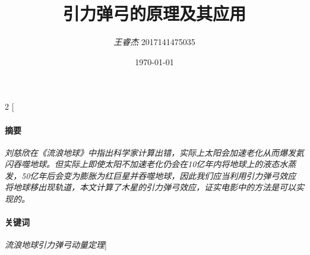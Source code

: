 \documentclass[UTF8,a4paper,10pt]{ctexart}
\title{\textbf{引力弹弓的原理及其应用}}
\author{\textit{王睿杰} 2017141475035}
\date{\today}
\begin{document}
\begin{multicols}{2}
[\maketitle
\paragraph{摘\quad 要}    \textit{刘慈欣在《流浪地球》中指出科学家计算出错，实际上太阳会加速老化从而爆发氦闪吞噬地球。但实际上即使太阳不加速老化仍会在10亿年内将地球上的液态水蒸发，50亿年后会变为膨胀为红巨星并吞噬地球，因此我们应当利用引力弹弓效应将地球移出现轨道，本文计算了木星的引力弹弓效应，证实电影中的方法是可以实现的。}
\paragraph{关键词}  \textit{流浪地球\quad 引力弹弓\quad 动量定理}]

\end{multicols}
\end{document}
